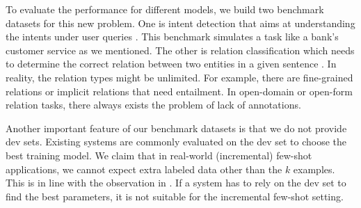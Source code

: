 \documentclass[11pt]{article}
\begin{document}

To evaluate the performance for different models, we build two benchmark datasets for this new problem. One is intent detection that aims at understanding the intents under user queries \cite{liu2016attention, xia2018zero}. This benchmark simulates a task like a bank's customer service as we mentioned. The other is relation classification which needs to determine the correct relation between two entities in a given sentence \cite{zeng2014relation}. In reality, the relation types might be unlimited. For example, there are fine-grained relations or implicit relations that need entailment. In open-domain or open-form relation tasks, there always exists the problem of lack of annotations. 

Another important feature of our benchmark datasets is that we do not provide dev sets. Existing systems are commonly evaluated on the dev set to choose the best training model. We claim that in real-world (incremental) few-shot applications, we cannot expect extra labeled data other than the $k$ examples. This is in line with the observation in \citet{DBLP07676}. If a system has to rely on the dev set to find the best parameters, it is not suitable for the incremental few-shot setting.

\end{document}
